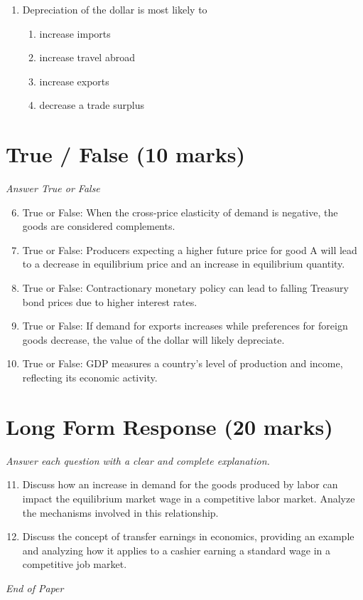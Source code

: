 \documentclass[12pt]{article}
\begin{document}
\begin{enumerate}[label=\arabic*.]
\begin{enumerate}[label=(\alph*)]
    \item an appreciation of the country's currency.
    \item low levels of income relative to other nations.
\end{enumerate}
\item Depreciation of the dollar is most likely to
\begin{enumerate}[label=(\alph*)]
    \item increase imports
    \item increase travel abroad
    \item increase exports
    \item decrease a trade surplus
\end{enumerate}
\end{enumerate}

\section*{True / False (10 marks)}
\textit{Answer True or False}
\begin{enumerate}[label=\arabic*.]
\setcounter{enumi}{5}
\item True or False: When the cross-price elasticity of demand is negative, the goods are considered complements.
\item True or False: Producers expecting a higher future price for good A will lead to a decrease in equilibrium price and an increase in equilibrium quantity.
\item True or False: Contractionary monetary policy can lead to falling Treasury bond prices due to higher interest rates.
\item True or False: If demand for exports increases while preferences for foreign goods decrease, the value of the dollar will likely depreciate.
\item True or False: GDP measures a country's level of production and income, reflecting its economic activity.
\end{enumerate}

\section*{Long Form Response (20 marks)}
\textit{Answer each question with a clear and complete explanation.}
\begin{enumerate}[label=\arabic*.]
\setcounter{enumi}{10}
\item Discuss how an increase in demand for the goods produced by labor can impact the equilibrium market wage in a competitive labor market. Analyze the mechanisms involved in this relationship.
\item Discuss the concept of transfer earnings in economics, providing an example and analyzing how it applies to a cashier earning a standard wage in a competitive job market.
\end{enumerate}

\vfill
\noindent\textit{End of Paper}
\end{document}
